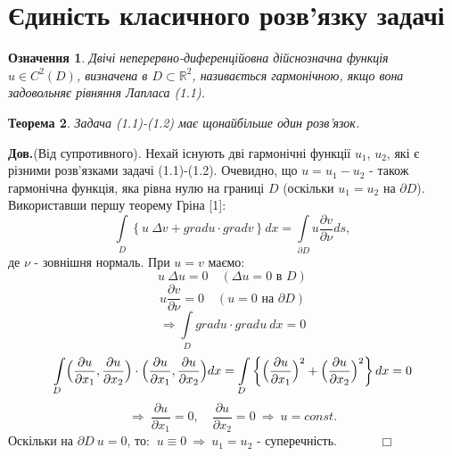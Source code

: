\documentclass[a4 paper,12pt,ukrainian]{report}
\newtheorem{theorem}{\textbf{Теорема}}[chapter]
\newtheorem{determination}[theorem]{\textbf{Означення}}
\begin{document}
\section{Єдиність класичного розв'язку задачі}
\begin{determination}
Двічі неперервно-диференційовна дійснозначна функція $u\in C^2(D)$, визначена в $D\subset\mathbb{R}^2$, називається гармонічною, якщо вона задовольняє рівняння Лапласа (1.1).
\end{determination}
\begin{theorem}
Задача (1.1)-(1.2) має щонайбільше один розв'язок.
\end{theorem}
\textbf{Дов.}(Від супротивного). Нехай існують дві гармонічні функції $u_1$, $u_2$, які є різними розв'язками задачі (1.1)-(1.2). Очевидно, що $u=u_1-u_2$ - також гармонічна функція, яка рівна нулю на границі $D$ (оскільки $u_1=u_2$ на $\partial D$).\\
\hspace*{\parindent}Використавши першу теорему Гріна [1]:
\begin{equation*}
\int\limits_{D}\left\{u \ \Delta v+gradu\cdot gradv\right\}dx=\int\limits_{\partial D}u\frac{\partial v}{\partial\nu}ds,
\end{equation*}
де $\nu$ - зовнішня нормаль. При $u=v$ маємо:
\begin{equation*}
u \ \Delta u=0 \quad (\Delta u=0\text{ в }D)
\end{equation*}
\begin{equation*}
u\frac{\partial v}{\partial\nu}=0 \quad (u=0\text{ на }\partial D)
\end{equation*}
\begin{equation*}
\Rightarrow\int\limits_{D}gradu\cdot gradu \ dx=0
\end{equation*}
\begin{equation*}
\int\limits_{D}\Bigl(\frac{\partial u}{\partial x_1},\frac{\partial u}{\partial x_2}\Bigr)\cdot\Bigl(\frac{\partial u}{\partial x_1},\frac{\partial u}{\partial x_2}\Bigr)dx=\int\limits_{D}\left\{\Bigl(\frac{\partial u}{\partial x_1}\Bigr)^2+\Bigl(\frac{\partial u}{\partial x_2}\Bigr)^2\right\}dx=0
\end{equation*}
\begin{equation*}
\Rightarrow \ \frac{\partial u}{\partial x_1}=0, \quad \frac{\partial u}{\partial x_2}=0 \ \Rightarrow \ u=const.
\end{equation*}
Оскільки на $\partial D \ u=0$, то: $ \ u\equiv 0 \ \Rightarrow \ u_1=u_2$ - суперечність. $\quad\quad\quad\Box$ 
\newpage
\end{document}
